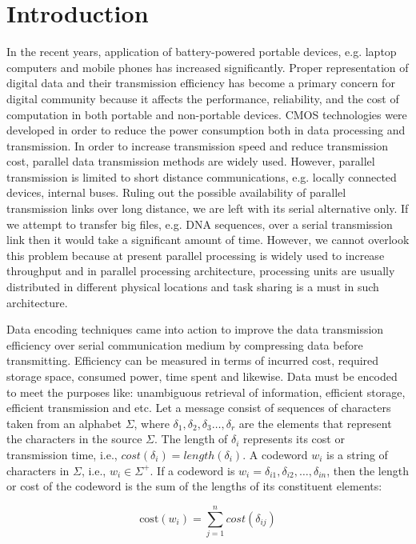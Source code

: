 \documentclass[twocolumn,12pt,a4paper]{article}
\begin{document}
\normalsize
\section{Introduction}
\label{sec1}
In the recent years, application of battery-powered portable devices, e.g. laptop computers and mobile phones has increased significantly. Proper representation of digital data and their transmission efficiency has become a primary concern for digital community because it affects the performance, reliability, and the cost of computation in both portable and non-portable devices. CMOS technologies were developed in order to reduce the power consumption both in data processing and transmission. In order to increase transmission speed and reduce transmission cost, parallel data transmission methods are widely used. However, parallel transmission is limited to short distance communications, e.g. locally connected devices, internal buses. Ruling out the possible availability of parallel transmission links over long distance, we are left with its serial alternative only. If we attempt to transfer big files, e.g. DNA sequences, over a serial transmission link then it would take a significant amount of time. However, we cannot overlook this problem because at present parallel processing is widely used to increase throughput and in parallel processing architecture, processing units are usually distributed in different physical locations and task sharing is a must in such architecture.    

Data encoding techniques came into action to improve the data transmission efficiency over serial communication medium by compressing data before transmitting. Efficiency can be measured in terms of incurred cost, required storage space, consumed power, time spent and likewise. Data must be encoded to meet the purposes like: unambiguous retrieval of information, efficient storage, efficient transmission and etc. Let a message consist of sequences of characters taken from an alphabet $\Sigma$, where  $\delta_1,\delta_2,\delta_3\ldots,\delta_r$ are the elements that represent the characters in the source $\Sigma$. The length of $\delta_i$ represents its cost or transmission time, i.e., $cost\left(\delta_i\right)= length(\delta_i)$. A codeword $w_i$ is a string of characters in $\Sigma$, i.e., $w_i\in\Sigma^{+}$. If a codeword is $w_i=\delta_{i1},\delta_{i2},\ldots,\delta_{in}$, then the length or cost of the codeword is the sum of the lengths of its constituent elements:

\begin{equation}
\label{eqn1}
  \text{cost}\left(w_i\right)=\sum_{j=1}^{n}cost\left(\delta_{ij}\right)
\end{equation} 
  
\end{document}
